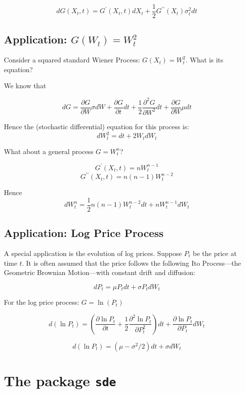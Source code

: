 \documentclass[11pt,]{article}
\begin{document}
\[dG(X_t, t) = G^{\prime}(X_t, t)dX_t + \frac{1}{2} G^{\prime\prime}(X_t) \sigma^2_tdt\]

\subsection{\texorpdfstring{Application:
\(G(W_t) = W_t^2\)}{Application: G(W\_t) = W\_t\^{}2}}\label{application-gw_t-w_t2}

Consider a squared standard Wiener Process: \(G(X_t) = W_t^2\). What is
its equation?

We know that

\[dG = \frac{\partial G}{\partial W}\sigma dW + 
\frac{\partial G}{\partial t}dt +
\frac{1}{2}\frac{\partial^2 G}{\partial W^2}dt +
\frac{\partial G}{\partial W}\mu dt
\]

Hence the (stochastic differential) equation for this process is:
\[dW_t^2 = dt + 2W_tdW_t\]

What about a general process \(G = W_t^n\)?

\[G^{\prime}(X_t, t) = nW_t^{n-1}\]
\[G^{\prime\prime}(X_t, t) = n(n-1)W_t^{n-2}\]

Hence \[dW_t^n = \frac{1}{2}n(n-1)W_t^{n-2}dt + nW_t^{n-1}dW_t\]

\subsection{Application: Log Price
Process}\label{application-log-price-process}

A special application is the evolution of log prices. Suppose \(P_t\) be
the price at time \(t\). It is often assumed that the price follows the
following Ito Process---the Geometric Brownian Motion---with constant
drift and diffusion:

\[dP_t = \mu P_tdt + \sigma P_t dW_t\]

For the log price process: \(G = \ln(P_t)\)

\[d(\ln P_t) = (\frac{\partial \ln P_t}{\partial t} + 
\frac{1}{2} \frac{\partial^2 \ln P_t}{\partial P^2_t}) dt +
\frac{\partial \ln P_t}{\partial P_t}dW_t
\]

\[d(\ln P_t) = (\mu-\sigma^2/2)dt + \sigma dW_t \]

\section{\texorpdfstring{The package
\texttt{sde}}{The package sde}}\label{the-package-sde}
\end{document}
